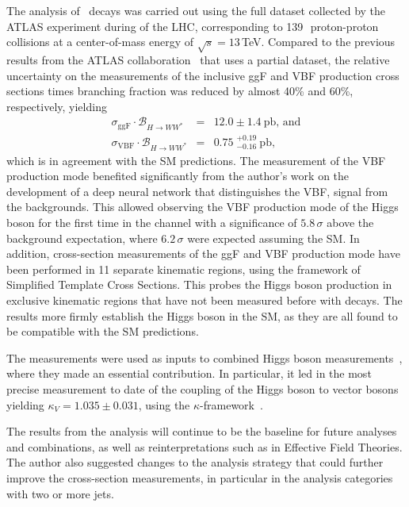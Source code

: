 The analysis of \HWW\ decays was carried out using the full dataset collected by the ATLAS experiment during \RunTwo of the LHC, corresponding to 139\,\ifb\ proton-proton collisions at a center-of-mass energy of $\sqrt{s} = 13\,$TeV. 
Compared to the previous results from the ATLAS collaboration~\cite{HIGG-2016-07} that uses a partial \RunTwo dataset, the relative uncertainty on the measurements of the inclusive ggF and VBF production cross sections times branching fraction was reduced by almost 40\% and 60\%, respectively, yielding 
\begin{eqnarray*}
    \sigma_{\mathrm{ggF}} \cdot \mathcal{B}_{H \to WW^{\ast}} &=& 12.0 \pm 1.4~\mathrm{pb}, \,\text{and} \\
    \sigma_{\mathrm{VBF}} \cdot \mathcal{B}_{H \to WW^{\ast}} &=& 0.75\;^{+0.19}_{-0.16}~\mathrm{pb},
\end{eqnarray*}
which is in agreement with the SM predictions.
The measurement of the VBF production mode benefited significantly from the author's work on the development of a deep neural network that distinguishes the VBF, \HWW signal from the backgrounds.
This allowed observing the VBF production mode of the Higgs boson for the first time in the \HWW channel with a significance of $5.8\,\sigma$ above the background expectation, where $6.2\,\sigma$ were expected assuming the SM.
In addition, cross-section measurements of the ggF and VBF production mode have been performed in 11 separate kinematic regions, using the framework of Simplified Template Cross Sections. This probes the Higgs boson production in exclusive kinematic regions that have not been measured before with \HWW decays.
The results more firmly establish the Higgs boson in the SM, as they are all found to be compatible with the SM predictions.

The measurements were used as inputs to combined Higgs boson measurements~\cite{NaturePaper}, where they made an essential contribution. 
In particular, it led in the most precise measurement to date of the coupling of the Higgs boson to vector bosons yielding $\kappa_{V} = 1.035 \pm 0.031$, using the $\kappa$-framework~\cite{LHCHandbookV3}.

The results from the \HWW analysis will continue to be the baseline for future analyses and combinations, as well as reinterpretations such as in Effective Field Theories.
The author also suggested changes to the analysis strategy that could further improve the \HWW cross-section measurements, in particular in the analysis categories with two or more jets.

